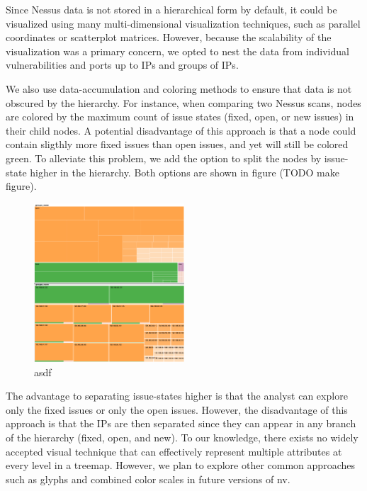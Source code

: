 \documentclass{acm_proc_article-sp}
\begin{document}
Since Nessus data is not stored in a hierarchical form by default, it could be visualized using many multi-dimensional visualization techniques, such as parallel coordinates or scatterplot matrices.
However, because the scalability of the visualization was a primary concern, we opted to nest the data from individual vulnerabilities and ports up to IPs and groups of IPs.


We also use data-accumulation and coloring methods to ensure that data is not obscured by the hierarchy.
For instance, when comparing two Nessus scans, nodes are colored by the maximum count of issue states (fixed, open, or new issues) in their child nodes.
A potential disadvantage of this approach is that a node could contain sligthly more fixed issues than open issues, and yet will still be colored green.
To alleviate this problem, we add the option to split the nodes by issue-state higher in the hierarchy.
Both options are shown in figure (TODO make figure).



\begin{figure}
  \centering
  \includegraphics[width=0.5\textwidth]{../screenshots/state_issue}
  \caption{asdf}
\end{figure}

The advantage to separating issue-states higher is that the analyst can explore only the fixed issues or only the open issues.
However, the disadvantage of this approach is that the IPs are then separated since they can appear in any branch of the hierarchy (fixed, open, and new).
To our knowledge, there exists no widely accepted visual technique that can effectively represent multiple attributes at every level in a treemap.
However, we plan to explore other common approaches such as glyphs and combined color scales in future versions of nv.
\end{document}
